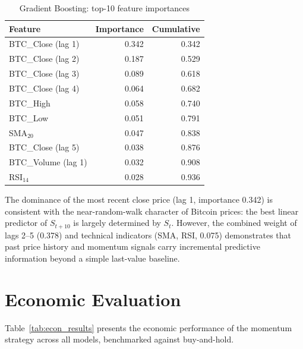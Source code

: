\documentclass[12pt, a4paper, oneside]{report}
\theoremstyle{plain}
\theoremstyle{definition}
\theoremstyle{remark}
\begin{document}
\begin{table}[H]
\begin{singlespace}
\fontsize{10}{11}\selectfont
\caption{Gradient Boosting: top-10 feature importances}
\label{tab:feat_imp}
\begin{tabular}{@{}lrr@{}}
\toprule
Feature & Importance & Cumulative \\
\midrule
BTC\_Close (lag 1)  & 0.342 & 0.342 \\
BTC\_Close (lag 2)  & 0.187 & 0.529 \\
BTC\_Close (lag 3)  & 0.089 & 0.618 \\
BTC\_Close (lag 4)  & 0.064 & 0.682 \\
BTC\_High           & 0.058 & 0.740 \\
BTC\_Low            & 0.051 & 0.791 \\
SMA$_{20}$          & 0.047 & 0.838 \\
BTC\_Close (lag 5)  & 0.038 & 0.876 \\
BTC\_Volume (lag 1) & 0.032 & 0.908 \\
RSI$_{14}$          & 0.028 & 0.936 \\
\bottomrule
\end{tabular}
\end{singlespace}
\end{table}

The dominance of the most recent close price (lag 1, importance 0.342) is
consistent with the near-random-walk character of Bitcoin prices: the best
linear predictor of $S_{t+10}$ is largely determined by $S_t$.  However, the
combined weight of lags 2--5 (0.378) and technical indicators (SMA, RSI, 0.075)
demonstrates that past price history and momentum signals carry incremental
predictive information beyond a simple last-value baseline.

\section{Economic Evaluation}

Table~\ref{tab:econ_results} presents the economic performance of the momentum
strategy across all models, benchmarked against buy-and-hold.
\end{document}
